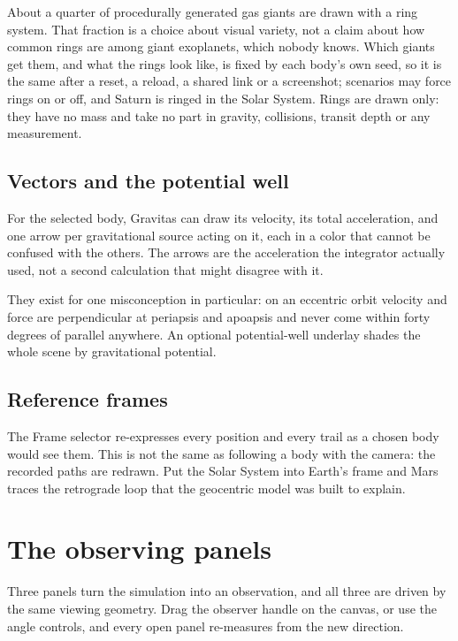 \documentclass[11pt,a4paper]{article}
\newcommand{\ui}[1]{\textsf{#1}}
\begin{document}
About a quarter of procedurally generated gas giants are drawn with a ring
system. That fraction is a choice about visual variety, not a claim about how
common rings are among giant exoplanets, which nobody knows. Which giants get
them, and what the rings look like, is fixed by each body's own seed, so it is
the same after a reset, a reload, a shared link or a screenshot; scenarios may
force rings on or off, and Saturn is ringed in the Solar System. Rings are
drawn only: they have no mass and take no part in gravity, collisions, transit
depth or any measurement.

\subsection{Vectors and the potential well}

For the selected body, Gravitas can draw its velocity, its total acceleration,
and one arrow per gravitational source acting on it, each in a color that cannot
be confused with the others. The arrows are the acceleration the integrator
actually used, not a second calculation that might disagree with it.

They exist for one misconception in particular: on an eccentric orbit velocity
and force are perpendicular at periapsis and apoapsis and never come within forty
degrees of parallel anywhere. An optional potential-well underlay shades the
whole scene by gravitational potential.

\subsection{Reference frames}

The \ui{Frame} selector re-expresses every position and every trail as a chosen
body would see them. This is not the same as following a body with the camera:
the recorded paths are redrawn. Put the Solar System into Earth's frame and Mars
traces the retrograde loop that the geocentric model was built to explain.

\section{The observing panels}

Three panels turn the simulation into an observation, and all three are driven by
the same viewing geometry. Drag the observer handle on the canvas, or use the
angle controls, and every open panel re-measures from the new direction.
\end{document}
